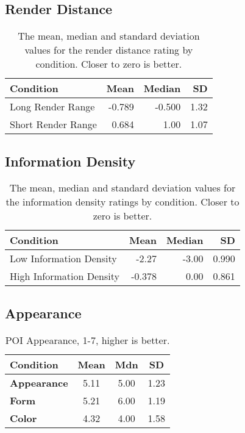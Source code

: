 \subsection{Render Distance}
\begin{table}[H]
    \centering
    \caption{The mean, median and standard deviation values for the render distance rating by condition. Closer to zero is better.}
    \begin{tabular}{lrrr}
    \toprule
    \textbf{Condition} & \textbf{Mean} & \textbf{Median} & \textbf{SD} \\
    \midrule
    Long Render Range  & -0.789        & -0.500          & 1.32        \\
    Short Render Range & 0.684         & 1.00            & 1.07        \\
    \bottomrule
    \end{tabular}
\end{table}


\subsection{Information Density}
\begin{table}[H]
    \centering
    \caption{The mean, median and standard deviation values for the information density ratings by condition. Closer to zero is better.}
    \begin{tabular}{lrrr}
    \toprule
    \textbf{Condition} & \textbf{Mean} & \textbf{Median} & \textbf{SD} \\
    \midrule
    Low Information Density  & -2.27   & -3.00           & 0.990        \\
    High Information Density & -0.378  & 0.00            & 0.861        \\
    \bottomrule
    \end{tabular}
\end{table}



\subsection{Appearance}
\begin{table}[H]
    \centering
    \caption{POI Appearance, 1-7, higher is better.}
    \label{tab:POIAppearance}
    \begin{tabular}{lccc}
    \toprule
    \textbf{Condition}   & Mean           & Mdn           & SD      \\
    \midrule
    \textbf{Appearance}  & 5.11           & 5.00          & 1.23    \\
    \textbf{Form}        & 5.21           & 6.00          & 1.19    \\
    \textbf{Color}       & 4.32           & 4.00          & 1.58    \\
    \bottomrule                
    \end{tabular}
\end{table}



